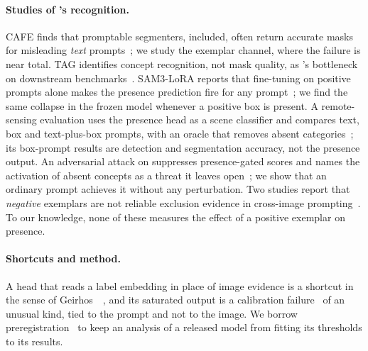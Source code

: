 \paragraph{Studies of \sam{}'s recognition.}
CAFE finds that promptable segmenters, \sam{} included, often return accurate masks for misleading \emph{text} prompts~\cite{liang2026cafe}; we study the exemplar channel, where the failure is near total.
TAG identifies concept recognition, not mask quality, as \sam{}'s bottleneck on downstream benchmarks~\cite{zhu2026tag}.
SAM3-LoRA reports that fine-tuning on positive prompts alone makes the presence prediction fire for any prompt~\cite{malaisree2026sam3lora}; we find the same collapse in the frozen model whenever a positive box is present.
A remote-sensing evaluation uses the presence head as a scene classifier and compares text, box and text-plus-box prompts, with an oracle that removes absent categories~\cite{dabaja2026remote}; its box-prompt results are detection and segmentation accuracy, not the presence output.
An adversarial attack on \sam{} suppresses presence-gated scores and names the activation of absent concepts as a threat it leaves open~\cite{wang2026ucd}; we show that an ordinary prompt achieves it without any perturbation.
Two studies report that \emph{negative} exemplars are not reliable exclusion evidence in cross-image prompting~\cite{tsai2026fss,tsai2026case}.
To our knowledge, none of these measures the effect of a positive exemplar on presence.

\paragraph{Shortcuts and method.}
A head that reads a label embedding in place of image evidence is a shortcut in the sense of Geirhos~\etal~\cite{geirhos2020shortcut}, and its saturated output is a calibration failure~\cite{guo2017calibration} of an unusual kind, tied to the prompt and not to the image.
We borrow preregistration~\cite{nosek2018prereg} to keep an analysis of a released model from fitting its thresholds to its results.
